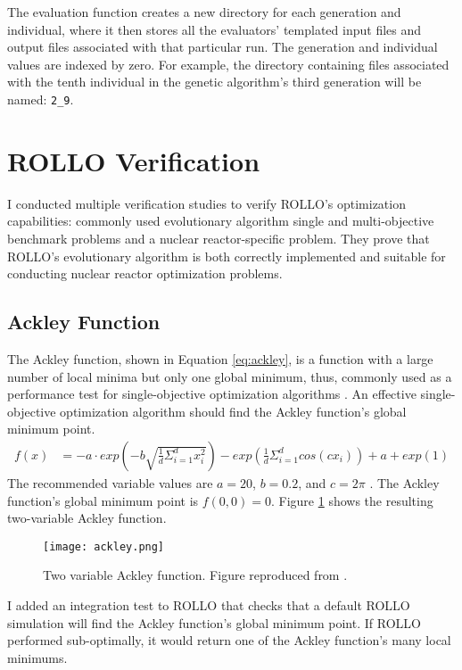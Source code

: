 The evaluation function creates a new directory for each generation and individual, 
where it then stores all the evaluators' templated input files and output files 
associated with that particular run. 
The generation and individual values are indexed by zero. 
For example, the directory containing files associated with the tenth individual in 
the genetic algorithm's third generation will be named: 
\texttt{2\_9}.

\section{ROLLO Verification}
\label{sec:rollo-verification}
I conducted multiple verification studies to verify \gls{ROLLO}'s optimization capabilities: 
commonly used evolutionary algorithm single and multi-objective benchmark problems and 
a nuclear reactor-specific problem. 
They prove that \gls{ROLLO}'s evolutionary algorithm is both correctly implemented 
and suitable for conducting nuclear reactor optimization problems. 

\subsection{Ackley Function}
The Ackley function, shown in Equation \ref{eq:ackley}, is a function with a 
large number of local minima but only one global minimum, thus, commonly used as a 
performance test for single-objective optimization algorithms 
\cite{ackley_connectionist_2012}. 
An effective single-objective optimization algorithm should find the Ackley function's 
global minimum point.  
\begin{align}
    \label{eq:ackley}
    f(x) &= -a \cdot exp \left(-b\sqrt{\frac{1}{d}\Sigma_{i=1}^dx_i^2}\right) - 
    exp \left(\frac{1}{d}\Sigma_{i=1}^d cos(cx_i)\right) + a + exp(1) 
\end{align}
The recommended variable values are $a=20$, $b=0.2$, and $c=2\pi$
\cite{surjanovic_ackley_2013}. 
The Ackley function's global minimum point is $f(0,0) = 0$. 
Figure \ref{fig:ackley} shows the resulting two-variable Ackley function.
\begin{figure}[htbp]
    \centering
    \texttt{[image: ackley.png]} 
    \caption{Two variable Ackley function. Figure reproduced from \cite{surjanovic_ackley_2013}.}
    \label{fig:ackley}
\end{figure}

I added an integration test to \gls{ROLLO} that checks that a default \gls{ROLLO} 
simulation will find the Ackley function's global minimum point. 
If \gls{ROLLO} performed sub-optimally, it would return one of the Ackley 
function's many local minimums. 

